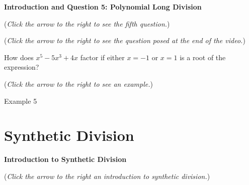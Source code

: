 \documentclass{ximera}
\begin{document}
\textbf{Introduction and Question 5: Polynomial Long Division}
\begin{question}
\begin{flushright}
{\color{blue}(\emph{Click the arrow to the right to see the fifth question.})}
\end{flushright}
\begin{center}
\begin{expandable}
{\color{blue}(\emph{Click the arrow to the right to see the  question
posed at the end of the video.})}
\begin{expandable}
How does $x^5 - 5x^3 + 4x$ factor if either $x=-1$ or $x=1$ is a root of the expression?
\begin{multipleChoice}
\end{multipleChoice}
\begin{flushright}
{\color{blue}(\emph{Click the arrow to the right to see an example.})}
\end{flushright}
\begin{expandable}
Example 5
\end{expandable}
\end{expandable}
\end{expandable}
\end{center}
\end{question}


\section{Synthetic Division}

\textbf{Introduction to Synthetic Division}
\begin{explanation}
{\color{blue}(\emph{Click the arrow to the right an introduction to 
synthetic division.})}
\begin{expandable}
\end{expandable}
\end{explanation}
\end{document}
